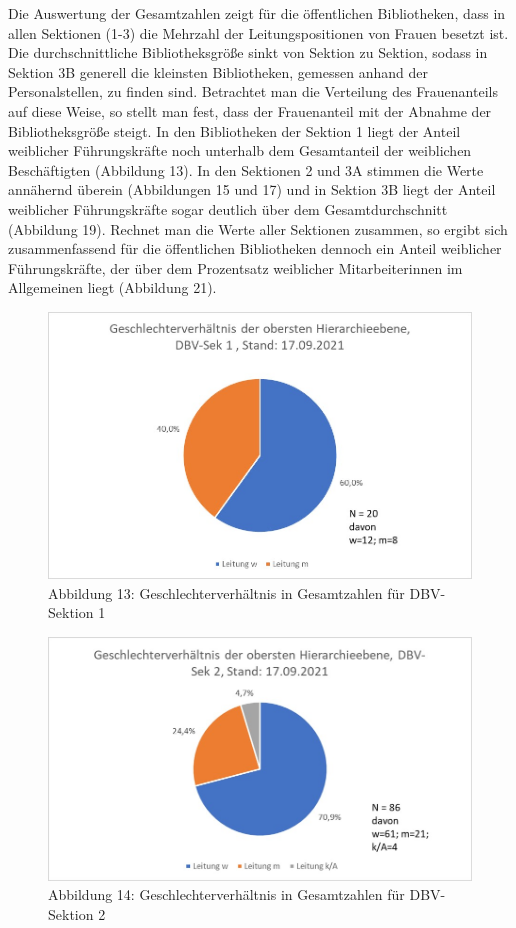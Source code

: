\documentclass[a4paper,
fontsize=11pt,
oneside,
numbers=noperiodatend,
parskip=half-,
bibliography=totoc,
final
]{scrartcl}
\begin{document}
Die Auswertung der Gesamtzahlen zeigt für die öffentlichen Bibliotheken,
dass in allen Sektionen (1-3) die Mehrzahl der Leitungspositionen von
Frauen besetzt ist. Die durchschnittliche Bibliotheksgröße sinkt von
Sektion zu Sektion, sodass in Sektion 3B generell die kleinsten
Bibliotheken, gemessen anhand der Personalstellen, zu finden sind.
Betrachtet man die Verteilung des Frauenanteils auf diese Weise, so
stellt man fest, dass der Frauenanteil mit der Abnahme der
Bibliotheksgröße steigt. In den Bibliotheken der Sektion 1 liegt der
Anteil weiblicher Führungskräfte noch unterhalb dem Gesamtanteil der
weiblichen Beschäftigten (Abbildung 13). In den Sektionen 2 und 3A
stimmen die Werte annähernd überein (Abbildungen 15 und 17) und in
Sektion 3B liegt der Anteil weiblicher Führungskräfte sogar deutlich
über dem Gesamtdurchschnitt (Abbildung 19). Rechnet man die Werte aller
Sektionen zusammen, so ergibt sich zusammenfassend für die öffentlichen
Bibliotheken dennoch ein Anteil weiblicher Führungskräfte, der über dem
Prozentsatz weiblicher Mitarbeiterinnen im Allgemeinen liegt (Abbildung
21).

\begin{figure}
\centering
\includegraphics{img/Abb.13_DBV-Sek1_gesamt.jpg}
\caption{Abbildung 13: Geschlechterverhältnis in Gesamtzahlen für
DBV-Sektion 1}
\end{figure}

\begin{figure}
\centering
\includegraphics{img/Abb.14_DBV-Sek2_gesamt.jpg}
\caption{Abbildung 14: Geschlechterverhältnis in Gesamtzahlen für
DBV-Sektion 2}
\end{figure}
\end{document}
